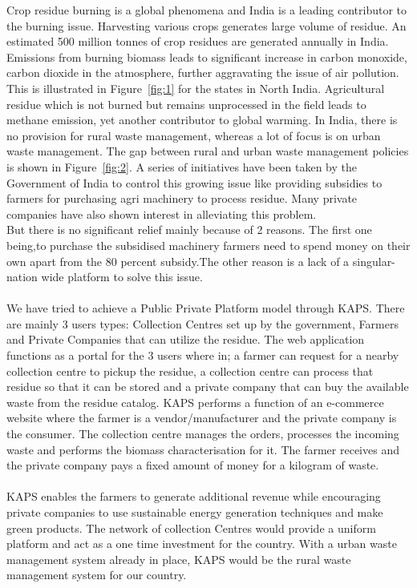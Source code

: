 \documentclass[conference]{IEEEtran}
\begin{document}
Crop residue burning is a global phenomena and India is a leading contributor to the burning issue. Harvesting various crops generates large volume of residue. An estimated 500 million tonnes of crop residues are generated annually in India. Emissions from burning biomass leads to significant increase in carbon monoxide, carbon dioxide in the atmosphere, further aggravating the issue of air pollution\cite{b1}. This is illustrated in Figure~\ref{fig:1} for the states in North India. Agricultural residue which is not burned but remains unprocessed in the field leads to methane emission, yet another contributor to global warming. In India, there is no provision for rural waste management, whereas a lot of focus is on urban waste management. The gap between rural and urban waste management policies is shown in Figure~\ref{fig:2}. A series of initiatives have been taken by the Government of India to control this growing issue like providing subsidies to farmers for purchasing agri machinery to process residue. Many private companies have also shown interest in alleviating this problem. \\
But there is no significant relief mainly because of 2 reasons. The first one being,to purchase the subsidised machinery farmers need to spend money on their own apart from the 80 percent subsidy.The other reason is a lack of a singular-nation wide platform to solve this issue. \\
\\
We have tried to achieve a Public Private Platform model through KAPS. There are mainly 3 users types: Collection Centres set up by the government, Farmers and Private Companies that can utilize the residue. The web application functions as a portal for the 3 users where in; a farmer can request for a nearby collection centre to pickup the residue, a collection centre can process that residue so that it can be stored and a private company that can buy the available waste from the residue catalog. KAPS performs a function of an e-commerce website where the farmer is a vendor/manufacturer and the private company is the consumer. The collection centre manages the orders, processes the incoming waste and performs the biomass characterisation for it. The farmer receives and the private company pays a fixed amount of money for a kilogram of waste. \\
\\
KAPS enables the farmers to generate additional revenue while encouraging private companies to use sustainable energy generation techniques and make green products. The network of collection Centres would provide a uniform platform and act as a one time investment for the country. With a urban waste management system already in place, KAPS would be the rural waste management system for our country.  
\end{document}
